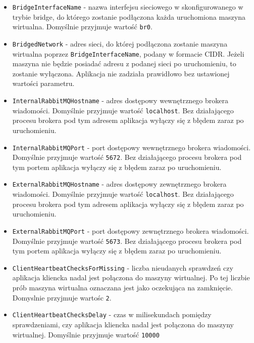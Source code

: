 \documentclass[../opis-rozwiazania.tex]{subfiles}
\begin{document}
\begin{itemize}
  \item \texttt{BridgeInterfaceName} - nazwa interfejsu sieciowego w skonfigurowanego w trybie bridge, do którego zostanie podłączona każda uruchomiona maszyna wirtualna. Domyślnie przyjmuje wartość \texttt{br0}.
  \item \texttt{BridgedNetwork} - adres sieci, do której podłączona zostanie maszyna wirtualna poprzez \texttt{BridgeInterfaceName}, podany w formacie CIDR. Jeżeli maszyna nie będzie posiadać adresu z podanej sieci po uruchomieniu, to zostanie wyłączona. Aplikacja nie zadziała prawidłowo bez ustawionej wartości parametru.
  \item \texttt{InternalRabbitMQHostname} - adres dostępowy wewnętrznego brokera wiadomości. Domyślnie przyjmuje wartość \texttt{localhost}. Bez działającego procesu brokera pod tym adresem aplikacja wyłączy się z błędem zaraz po uruchomieniu.
  \item \texttt{InternalRabbitMQPort} - port dostępowy wewnętrznego brokera wiadomości. Domyślnie przyjmuje wartość \texttt{5672}. Bez działającego procesu brokera pod tym portem aplikacja wyłączy się z błędem zaraz po uruchomieniu.
  \item \texttt{ExternalRabbitMQHostname} - adres dostępowy zewnętrznego brokera wiadomości. Domyślnie przyjmuje wartość \texttt{localhost}. Bez działającego procesu brokera pod tym adresem aplikacja wyłączy się z błędem zaraz po uruchomieniu.
  \item \texttt{ExternalRabbitMQPort} -  port dostępowy zewnętrznego brokera wiadomości. Domyślnie przyjmuje wartość \texttt{5673}. Bez działającego procesu brokera pod tym portem aplikacja wyłączy się z błędem zaraz po uruchomieniu.
  \item \texttt{ClientHeartbeatChecksForMissing} - liczba nieudanych sprawdzeń czy aplikacja kliencka nadal jest połączona do maszyny wirtualnej. Po tej liczbie prób maszyna wirtualna oznaczana jest jako oczekująca na zamknięcie. Domyslnie przyjmuje wartośc \texttt{2}.
  \item \texttt{ClientHeartbeatChecksDelay} - czas w milisekundach pomiędzy sprawdzeniami, czy aplikacja kliencka nadal jest połączona do maszyny wirtualnej. Domyślnie przyjmuje wartość \texttt{10000}
\end{itemize}
\end{document}
